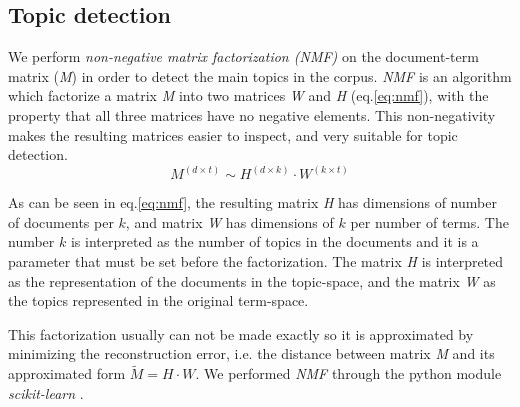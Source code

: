 \documentclass{bmcart}
\begin{document}
\begin{backmatter}
\subsection*{Topic detection}
\par We perform \emph{non-negative matrix factorization (NMF)} on the document-term matrix (\emph{M}) in order to detect the main topics in the corpus. 
\emph{NMF} is an algorithm which factorize a matrix \emph{M} into two matrices \emph{W} and \emph{H} (eq.\ref{eq:nmf}), with the property that all three matrices have no negative elements. This non-negativity makes the resulting matrices easier to inspect, and very suitable for topic detection.
\begin{equation}
M^{(d \times t)} \sim H^{(d \times k)} \cdot W^{(k \times t)}
\label{eq:nmf}
\end{equation}
\par As can be seen in eq.\ref{eq:nmf}, the resulting matrix \emph{H} has dimensions of number of documents per $k$, and matrix \emph{W} has dimensions of $k$ per number of terms. The number $k$ is interpreted as the number of topics in the documents and it is a parameter that must be set before the factorization.
The matrix \emph{H} is interpreted as the representation of the documents in the topic-space, and the matrix \emph{W} as the topics represented in the original term-space. 
\par This factorization usually can not be made exactly so it is approximated by minimizing the reconstruction error, i.e. the distance between matrix \emph{M} and its approximated form $\tilde{M} = H \cdot W$. We performed \emph{NMF} through the python module \emph{scikit-learn} \cite{scikit-learn}. %


\end{backmatter}
\end{document}
